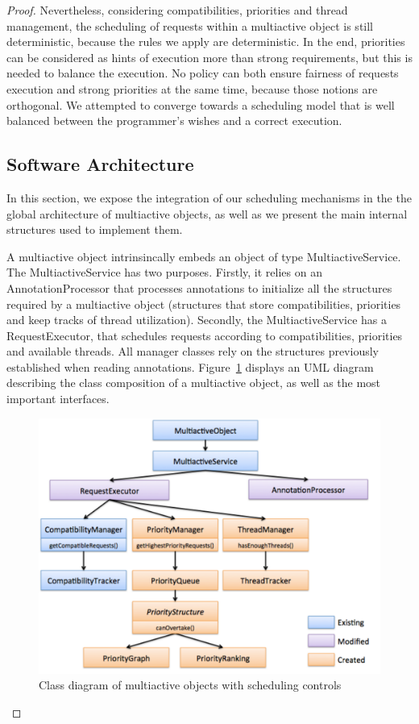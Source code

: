 \documentclass[11pt]{report}
\begin{document}
\begin{proof}
Nevertheless, considering compatibilities, priorities and thread management, the scheduling of requests within a multiactive object is still deterministic, because the rules we apply are deterministic. In the end, priorities can be considered as hints of execution more than strong requirements, but this is needed to balance the execution. No policy can both ensure fairness of requests execution and strong priorities at the same time, because those notions are orthogonal. We attempted to converge towards a scheduling model that is well balanced between the programmer's wishes and a correct execution.


\subsection{Software Architecture}
In this section, we expose the integration of our scheduling mechanisms in the  the global architecture of multiactive objects, as well as we present the main internal structures used to implement them.

A multiactive object intrinsincally embeds an object of type MultiactiveService. The MultiactiveService has two purposes. Firstly, it relies on an AnnotationProcessor that processes annotations to initialize all the structures required by a multiactive object (structures that store compatibilities, priorities and keep tracks of thread utilization). Secondly, the MultiactiveService has a RequestExecutor, that schedules requests according to compatibilities, priorities and available threads. All manager classes rely on the structures previously established when reading annotations. Figure~\ref{fig:uml} displays an UML diagram describing the class composition of a multiactive object, as well as the most important interfaces.

\begin{figure}[!ht]
      \begin{minipage}[c]{\textwidth}
      \centering
      \includegraphics[scale=0.5]{pictures/uml.pdf}
      \end{minipage}
      \caption{Class diagram of multiactive objects with scheduling controls}
      \label{fig:uml} 
\end{figure}


\end{proof}
\end{document}
